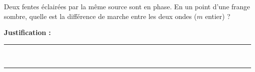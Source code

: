 Deux fentes éclairées par la même source sont en phase. En un point d'une frange sombre, quelle est la différence de marche entre les deux ondes ($m$ entier) ?

\choices

\noindent\textbf{Justification :} \hrulefill \\[2.5ex]
\rule{\linewidth}{0.4pt} \\[2.5ex]
\rule{\linewidth}{0.4pt}
\vfill
